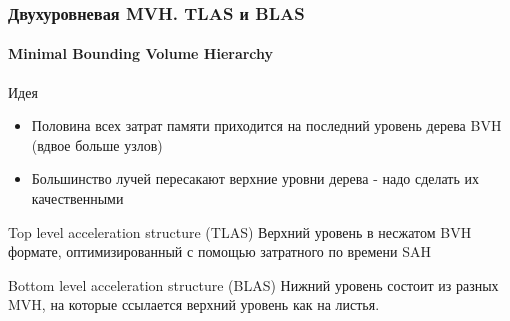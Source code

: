 \documentclass{beamer}
\begin{document}
\begin{frame}[t]
    \frametitle{Двухуровневая MVH. TLAS и BLAS}
    \framesubtitle{Minimal Bounding Volume Hierarchy}
    \begin{block}{Идея}
        \begin{itemize}
            \item
                Половина всех затрат памяти приходится на последний уровень дерева BVH (вдвое больше узлов)
            \item
                Большинство лучей пересакают верхние уровни дерева - надо сделать их качественными
        \end{itemize}
    \end{block}
    \begin{block}{Top level acceleration structure (TLAS)}
        Верхний уровень в несжатом BVH формате, оптимизированный с помощью затратного по времени SAH
    \end{block}
    \begin{block}{Bottom level acceleration structure (BLAS)}
        Нижний уровень состоит из разных MVH, на которые ссылается верхний уровень как на листья.
    \end{block}
\end{frame}
\end{document}
